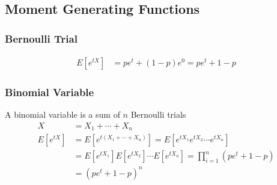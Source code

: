 \documentclass[../../probability-notes.tex]{subfiles}
\begin{document}
    \subsection{Moment Generating Functions}
    \subsubsection{Bernoulli Trial}
    \begin{align*}
        E[e^{tX}] &= pe^{t} + (1-p)e^{0} = pe^{t} + 1-p
    \end{align*}

    \subsubsection{Binomial Variable}
    A binomial variable is a sum of $n$ Bernoulli trials
    \begin{align*}
        X &= X_{1} + \cdots + X_{n}\\
        E[e^{tX}] &=E[e^{t(X_{1} + \cdots + X_{n})}] = E[e^{tX_{1}} e^{tX_{2}} \cdots e^{tX_{n}}]\\
        &= E[e^{tX_{1}}] E[e^{tX_{2}}] \cdots E[e^{tX_{n}}] = \prod_{i=1}^{n} (pe^{t} + 1-p)\\
        &= (pe^{t} + 1-p)^{n}
    \end{align*}
\end{document}
